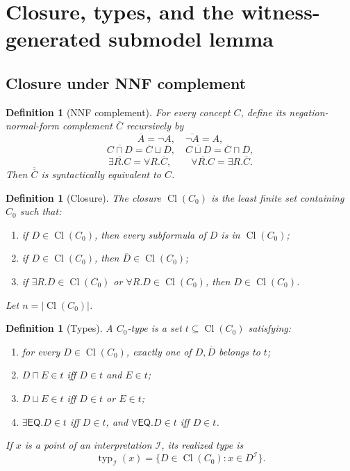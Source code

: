 \documentclass[11pt]{article}
\newtheorem{definition}[theorem]{Definition}
\newcommand{\EQ}{\mathsf{EQ}}
\newcommand{\Cl}{\operatorname{Cl}}
\newcommand{\I}{\mathcal I}
\newcommand{\typ}{\operatorname{typ}}
\begin{document}
\section{Closure, types, and the witness-generated submodel lemma}

\subsection{Closure under NNF complement}

\begin{definition}[NNF complement]\label{def:nnfcomp}
For every concept $C$, define its negation-normal-form complement $\overline C$ recursively by
\[
\overline A=\neg A,
\quad
\overline{\neg A}=A,
\]
\[
\overline{C\sqcap D}=\overline C\sqcup\overline D,
\quad
\overline{C\sqcup D}=\overline C\sqcap\overline D,
\]
\[
\overline{\exists R.C}=\forall R.\overline C,
\qquad
\overline{\forall R.C}=\exists R.\overline C.
\]
Then $\overline{\overline C}$ is syntactically equivalent to $C$.
\end{definition}

\begin{definition}[Closure]\label{def:closure}
The closure $\Cl(C_0)$ is the least finite set containing $C_0$ such that:
\begin{enumerate}[label=(C\arabic*)]
\item if $D\in\Cl(C_0)$, then every subformula of $D$ is in $\Cl(C_0)$;
\item if $D\in\Cl(C_0)$, then $\overline D\in\Cl(C_0)$;
\item if $\exists R.D\in\Cl(C_0)$ or $\forall R.D\in\Cl(C_0)$, then $D\in\Cl(C_0)$.
\end{enumerate}
Let $n=|\Cl(C_0)|$.
\end{definition}

\begin{definition}[Types]\label{def:types}
A $C_0$-type is a set $t\subseteq\Cl(C_0)$ satisfying:
\begin{enumerate}[label=(T\arabic*)]
\item for every $D\in\Cl(C_0)$, exactly one of $D,\overline D$ belongs to $t$;
\item $D\sqcap E\in t$ iff $D\in t$ and $E\in t$;
\item $D\sqcup E\in t$ iff $D\in t$ or $E\in t$;
\item $\exists\EQ.D\in t$ iff $D\in t$, and $\forall\EQ.D\in t$ iff $D\in t$.
\end{enumerate}
If $x$ is a point of an interpretation $\I$, its realized type is
\[
   \typ_\I(x)=\{D\in\Cl(C_0):x\in D^\I\}.
\]
\end{definition}
\end{document}
